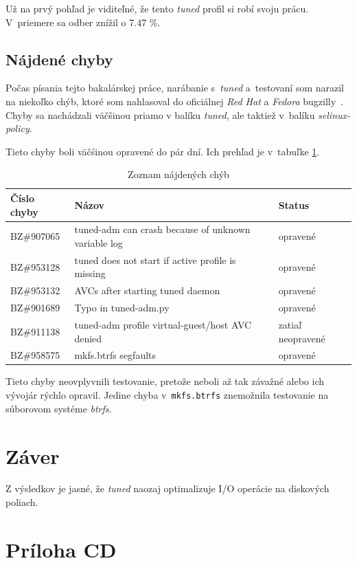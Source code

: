 Už na prvý pohľad je viditeľné, že tento \emph{tuned} profil si robí svoju
prácu. V~priemere sa odber znížil o 7.47 \%. 

%
%

\section{Nájdené chyby}

Počas písania tejto bakalárskej práce, narábanie s~\emph{tuned} a~testovaní som
narazil na niekoľko chýb, ktoré som nahlasoval do oficiálnej \emph{Red Hat} a
\emph{Fedora} bugzilly~\cite{rhBugzilla}. Chyby sa nachádzali väčšinou priamo v
balíku \emph{tuned}, ale taktiež v~balíku \emph{selinux-policy}.

Tieto chyby boli väčśinou opravené do pár dní. Ich prehľad je v~tabuľke \ref{tab:bugs}.

\begin{table}[H]
\begin{center}
\begin{tabular}{|l|l|l|}
    \hline
    \textbf{Číslo chyby} & \textbf{Názov} & \textbf{Status} \\
    \hline
    BZ\#907065 & tuned-adm can crash because of unknown variable log & opravené \\
    BZ\#953128 & tuned does not start if active profile is missing & opravené \\
    BZ\#953132 & AVCs after starting tuned daemon & opravené \\
    BZ\#901689 & Typo in tuned-adm.py & opravené \\
    BZ\#911138 & tuned-adm profile virtual-guest/host AVC denied & zatiaľ neopravené \\
    BZ\#958575 & mkfs.btrfs segfaults & opravené \\
    \hline
\end{tabular}
\caption{Zoznam nájdených chýb}
\label{tab:bugs}
\end{center}
\end{table}

Tieto chyby neovplyvnili testovanie, pretože neboli až tak závažné alebo ich
vývojár rýchlo opravil. Jedine chyba v~\texttt{mkfs.btrfs} znemožnila
testovanie na súborovom systéme \emph{btrfs}.


%
%

\chapter{Záver}

Z výsledkov je jasné, že \emph{tuned} naozaj optimalizuje I/O operácie na
diskových poliach. 

%
%

\setcounter{chapter}{0}
\renewcommand{\thechapter}{\Alph{chapter}}
\chapter{Príloha CD}

